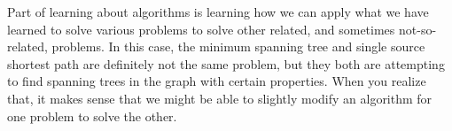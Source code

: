 Part of learning about algorithms is learning how we can 
apply what we have learned to solve various problems 
to solve other related, and sometimes not-so-related, problems.
In this case, the minimum spanning tree and single source shortest path
are definitely not the same problem, but they both are attempting
to find spanning trees in the graph with certain properties.
When you realize that, it makes sense that we might be able to
slightly modify an algorithm for one problem to solve the other.



